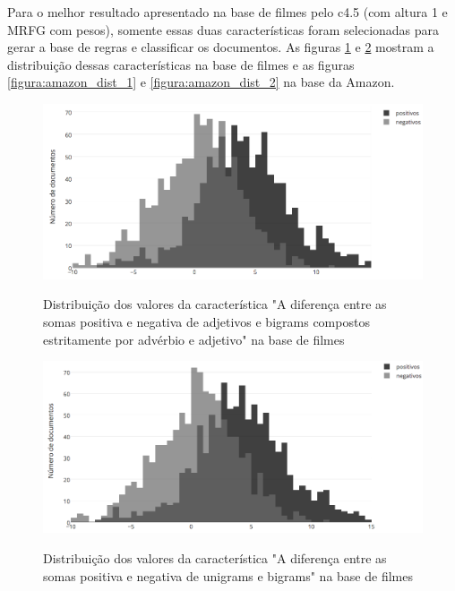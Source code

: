 \documentclass[template.tex]{subfiles}
\begin{document}
Para o melhor resultado apresentado na base de filmes pelo c4.5 (com altura 1 e MRFG com pesos), somente essas duas características foram selecionadas para gerar a base de regras e classificar os documentos. As figuras \ref{figura:movies_dist_1} e \ref{figura:movies_dist_2} mostram a distribuição dessas características na base de filmes e as figuras \ref{figura:amazon_dist_1} e \ref{figura:amazon_dist_2} na base da Amazon. 


\begin{figure}[phtb]
\caption{Distribuição dos valores da característica "A diferença entre as somas positiva e negativa de adjetivos e bigrams compostos estritamente por advérbio e adjetivo" na base de filmes}
\centering
\includegraphics[scale=0.50]{movies_positive_to_negative_ratio_of_adjectives_sum_and_bigrams_with_adjectives}
\label{figura:movies_dist_1}
\end{figure}

\begin{figure}[phtb]
\caption{Distribuição dos valores da característica "A diferença entre as somas positiva e negativa de unigrams e bigrams" na base de filmes}
\centering
\includegraphics[scale=0.5]{movies_positive_to_negative_ratio_of_unigrams_and_bigrams_sum}
\label{figura:movies_dist_2}
\end{figure}
\end{document}
